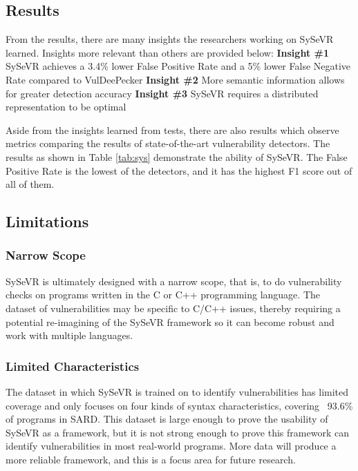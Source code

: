 \documentclass[12pt,twocolumn,letterpaper]{article}
\begin{document}
\subsection{Results}
\label{sub:results}
From the results, there are many insights the researchers working on SySeVR learned. Insights more relevant than others are
provided below:
\linebreak
\textbf{Insight \#1} SySeVR achieves a 3.4\% lower False Positive Rate and a 5\% lower False Negative Rate compared to VulDeePecker
\linebreak
\textbf{Insight \#2} More semantic information allows for greater detection accuracy
\linebreak
\textbf{Insight \#3} SySeVR requires a distributed representation to be optimal

Aside from the insights learned from tests, there are also results which observe metrics comparing the results 
of state-of-the-art vulnerability detectors. The results as shown in Table \ref{tab:sys} demonstrate the ability of SySeVR.
The False Positive Rate is the lowest of the detectors, and it has the highest F1 score out of all of them.

\subsection{Limitations}
\label{sub:limitations}
\subsubsection{Narrow Scope}
SySeVR is ultimately designed with a narrow scope, that is, to do vulnerability checks on programs written in
the C or C++ programming language. The dataset of vulnerabilities may be specific to C/C++ issues, thereby requiring
a potential re-imagining of the SySeVR framework so it can become robust and work with multiple languages.
\subsubsection{Limited Characteristics}
The dataset in which SySeVR is trained on to identify vulnerabilities has limited coverage and only focuses on four
kinds of syntax characteristics, covering ~93.6\% of programs in SARD. This dataset is large enough to prove the usability
of SySeVR as a framework, but it is not strong enough to prove this framework can identify vulnerabilities in most real-world
programs. More data will produce a more reliable framework, and this is a focus area for future research.
\end{document}
